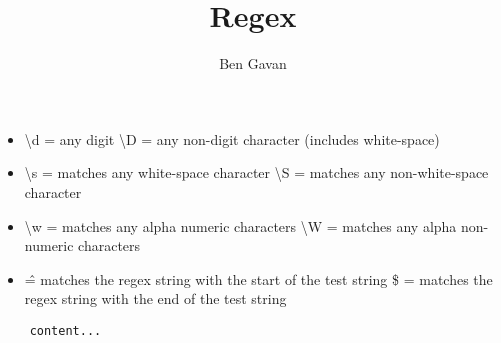 \documentclass[]{article}
\title{Regex}
\author{Ben Gavan}
\newcommand{\bs}{\textbackslash}
\begin{document}
\maketitle

\begin{abstract}

\end{abstract}

\section{}

\begin{itemize}
	\item \bs d = any digit 
	\subitem \bs D = any non-digit character (includes white-space)
	
	\item \bs s = matches any white-space character
	\subitem \bs S = matches any non-white-space character
	
	\item \bs w =  matches any alpha numeric characters
	\subitem \bs W = matches  any alpha non-numeric characters
	
	\item \^ = matches the regex string with the start of the test string
	\subitem \$ = matches the regex string with the end of the test string
\end{itemize}

\begin{lstlisting}
	content...
\end{lstlisting}
\end{document}
